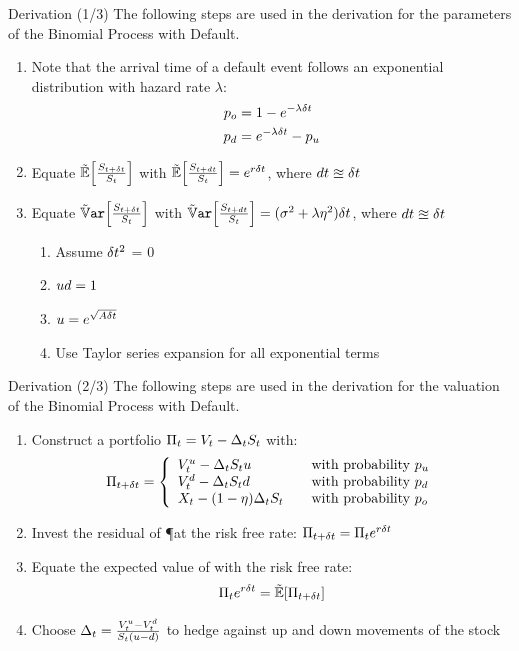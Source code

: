 \documentclass{beamer}
\begin{document}
\begin{frame}{Derivation (1/3)}
The following steps are used in the derivation for the parameters of the Binomial Process with Default.
\begin{enumerate}
 \item Note that the arrival time of a default event follows an exponential distribution with hazard rate $\lambda$:
       \begin{align}
        p_o &= 1 - e^{-\lambda\delta t} \\
        p_d &= e^{-\lambda\delta t} - p_u
       \end{align}
 \item Equate $\E[\frac{\SDt}{\S}]$ with $\E[\frac{\Sdt}{\S}] = e^{r\Dt}$, where $dt \approxeq \delta t$
 \item Equate $\Var[\frac{\SDt}{\S}]$ with $\Var[\frac{\Sdt}{\S}] = (\sigma^2 + \lambda\eta^2)\Dt$, where $dt \approxeq \delta t$
       \begin{enumerate}
        \item Assume $\delta t^2$ = 0
        \item $ud = 1$
        \item $u = e^{\sqrt{A\delta t}}$
        \item Use Taylor series expansion for all exponential terms
       \end{enumerate}
\end{enumerate}
\end{frame}

\begin{frame}{Derivation (2/3)}
The following steps are used in the derivation for the valuation of the Binomial Process with Default.
\begin{enumerate}
 \item Construct a portfolio $\Pi_t = V_t - \Delta_tS_t$ with:
       \begin{equation}
        \PDt = \left\{
                \begin{array}{l@{\qquad\mbox{with probability }}l}
                 \Vu - \D\S\u        & \pu \\
                 \Vd - \D\S\d        & \pd \\
                 \X - (1 - \eta)\D\S & \po
                \end{array}\right.
       \end{equation}
 \item Invest the residual of \P at the risk free rate: $\Pi_{t + \delta t} = \Pi_t e^{r\delta t}$
 \item Equate the expected value of \PDt with the risk free rate:
       \begin{align}
        \P e^{r\Dt} = \E[\PDt]
       \end{align}
 \item Choose $\Delta_t = \frac{V^{u}_t - V^{d}_t}{S_t(u - d)}$ to hedge against up and down movements of the stock
\end{enumerate}
\end{frame}
\end{document}
